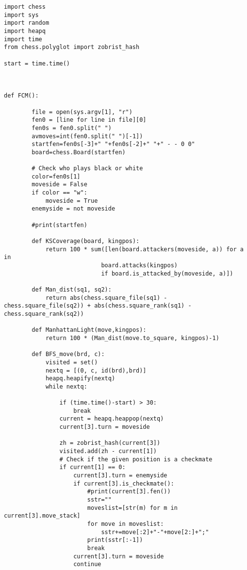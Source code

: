 \documentclass[runningheads]{llncs}
\begin{document}
\begin{lstlisting}
import chess
import sys
import random
import heapq
import time
from chess.polyglot import zobrist_hash

start = time.time()



def FCM():

        file = open(sys.argv[1], "r")
        fen0 = [line for line in file][0]
        fen0s = fen0.split(" ")
        avmoves=int(fen0.split(" ")[-1])
        startfen=fen0s[-3]+" "+fen0s[-2]+" "+" - - 0 0"
        board=chess.Board(startfen)

        # Check who plays black or white
        color=fen0s[1]
        moveside = False
        if color == "w":
            moveside = True
        enemyside = not moveside

        #print(startfen)

        def KSCoverage(board, kingpos):
            return 100 * sum([len(board.attackers(moveside, a)) for a in
                            board.attacks(kingpos)
                            if board.is_attacked_by(moveside, a)])

        def Man_dist(sq1, sq2):
            return abs(chess.square_file(sq1) - chess.square_file(sq2)) + abs(chess.square_rank(sq1) - chess.square_rank(sq2))

        def ManhattanLight(move,kingpos):
            return 100 * (Man_dist(move.to_square, kingpos)-1)

        def BFS_move(brd, c):
            visited = set()
            nextq = [(0, c, id(brd),brd)]
            heapq.heapify(nextq)
            while nextq:

                if (time.time()-start) > 30:
                    break
                current = heapq.heappop(nextq)
                current[3].turn = moveside

                zh = zobrist_hash(current[3])
                visited.add(zh - current[1])
                # Check if the given position is a checkmate
                if current[1] == 0:
                    current[3].turn = enemyside
                    if current[3].is_checkmate():
                        #print(current[3].fen())
                        sstr=""
                        moveslist=[str(m) for m in current[3].move_stack]
                        for move in moveslist:
                            sstr+=move[:2]+"-"+move[2:]+";"
                        print(sstr[:-1])
                        break
                    current[3].turn = moveside
                    continue


\end{lstlisting}
\end{document}
